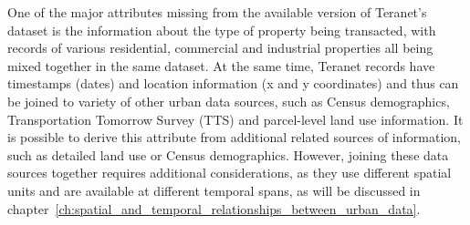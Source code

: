 One of the major attributes missing from the available version of Teranet's dataset is the information about the type of property being transacted, with records of various residential, commercial and industrial properties all being mixed together in the same dataset.
At the same time, Teranet records have timestamps (dates) and location information (x and y coordinates) and thus can be joined to variety of other urban data sources, such as Census demographics, Transportation Tomorrow Survey (TTS) and parcel-level land use information.
It is possible to derive this attribute from additional related sources of information, such as detailed land use or Census demographics.
However, joining these data sources together requires additional considerations, as they use different spatial units and are available at different temporal spans, as will be discussed in chapter~\ref{ch:spatial_and_temporal_relationships_between_urban_data}.
